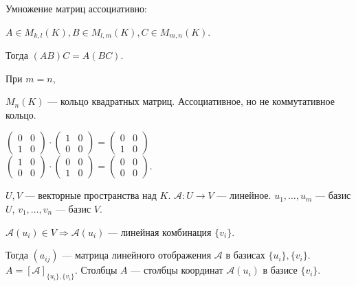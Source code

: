 \begin{consequence}
    Умножение матриц ассоциативно:

    $A \in M_{k, l}(K), B \in M_{l, m}(K), C \in M_{m, n}(K)$.

    Тогда $(AB)C = A(BC)$.
\end{consequence}
\begin{definition}
    При $m = n$,

    $M_n(K)$ --- кольцо квадратных матриц. Ассоциативное, но не коммутативное кольцо.
\end{definition}
\begin{example}
    $\begin{pmatrix} 0 & 0 \\ 1 & 0 \end{pmatrix} \cdot \begin{pmatrix} 1 & 0 \\ 0 & 0 \end{pmatrix} = \begin{pmatrix} 0 & 0 \\ 1 & 0 \end{pmatrix}$\\
    $\begin{pmatrix} 1 & 0 \\ 0 & 0 \end{pmatrix} \cdot \begin{pmatrix} 0 & 0 \\ 1 & 0 \end{pmatrix} = \begin{pmatrix} 0 & 0 \\ 0 & 0 \end{pmatrix}$.
\end{example}

$U, V$ --- векторные пространства над  $K$.  $\mathcal{A}\!: U \to V$ --- линейное.  $u_1, \ldots, u_m$ --- базис $U$,  $v_1, \ldots, v_n$ --- базис $V$.

$\mathcal{A}(u_i) \in V \Rightarrow \mathcal{A}(u_i)$ --- линейная комбинация  $\{ v_i \}$.

Тогда  $(a_{ij})$ --- матрица линейного отображения  $\mathcal{A}$ в базисах  $\{u_i\}, \{v_i\}$.  $A = [ \mathcal{A}]_{\{u_i\}, \{v_i\}}$. Столбцы  $A$ --- столбцы координат  $\mathcal{A}(u_i)$ в базисе  $\{v_i\}$.

